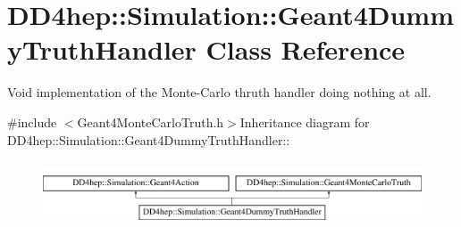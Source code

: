 \hypertarget{class_d_d4hep_1_1_simulation_1_1_geant4_dummy_truth_handler}{
\section{DD4hep::Simulation::Geant4DummyTruthHandler Class Reference}
\label{class_d_d4hep_1_1_simulation_1_1_geant4_dummy_truth_handler}
}


Void implementation of the Monte-\/Carlo thruth handler doing nothing at all.  


{\ttfamily \#include $<$Geant4MonteCarloTruth.h$>$}Inheritance diagram for DD4hep::Simulation::Geant4DummyTruthHandler::\begin{figure}[H]
\begin{center}
\leavevmode
\includegraphics[height=1.93103cm]{class_d_d4hep_1_1_simulation_1_1_geant4_dummy_truth_handler}
\end{center}
\end{figure}
